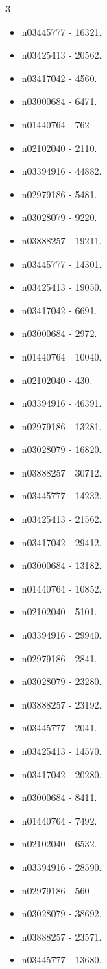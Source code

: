 \begin{multicols}{3}
\begin{itemize}
\item n03445777 - 16321.
\item n03425413 - 20562.
\item n03417042 - 4560.
\item n03000684 - 6471.
\item n01440764 - 762.
\item n02102040 - 2110.
\item n03394916 - 44882.
\item n02979186 - 5481.
\item n03028079 - 9220.
\item n03888257 - 19211.
\item n03445777 - 14301.
\item n03425413 - 19050.
\item n03417042 - 6691.
\item n03000684 - 2972.
\item n01440764 - 10040.
\item n02102040 - 430.
\item n03394916 - 46391.
\item n02979186 - 13281.
\item n03028079 - 16820.
\item n03888257 - 30712.
\item n03445777 - 14232.
\item n03425413 - 21562.
\item n03417042 - 29412.
\item n03000684 - 13182.
\item n01440764 - 10852.
\item n02102040 - 5101.
\item n03394916 - 29940.
\item n02979186 - 2841.
\item n03028079 - 23280.
\item n03888257 - 23192.
\item n03445777 - 2041.
\item n03425413 - 14570.
\item n03417042 - 20280.
\item n03000684 - 8411.
\item n01440764 - 7492.
\item n02102040 - 6532.
\item n03394916 - 28590.
\item n02979186 - 560.
\item n03028079 - 38692.
\item n03888257 - 23571.
\item n03445777 - 13680.

\end{itemize}
\end{multicols}
